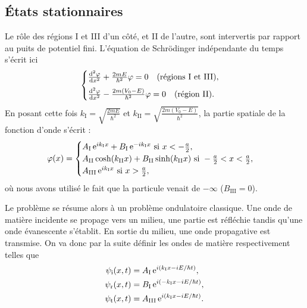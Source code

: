 \documentclass[12pt,fancy]{cours}
\begin{document}
\subsection{États stationnaires}


Le rôle des régions I et III d'un côté, et II de l'autre, sont intervertis par rapport au puits de potentiel fini. L'équation de Schrödinger indépendante du temps s’écrit ici
\begin{equation}
\begin{cases}
\frac{\mathrm{d}^2\varphi}{\mathrm{d} x^2}+\frac{2mE}{\hbar^2}\varphi=0\quad\text{(régions I et III)},\\[2mm]
\frac{\mathrm{d}^2\varphi}{\mathrm{d} x^2}-\frac{2m\left(V_0-E\right)}{\hbar^2}\varphi=0\quad\text{(région II)}.
\end{cases}
\label{eqn:schro_tunnel}
\end{equation}
En posant cette fois $k_\mathrm{I}=\sqrt{\frac{2mE}{\hbar^2}}$ et $k_\mathrm{II}=\sqrt{\frac{2m\left(V_0-E\right)}{\hbar^2}}$, la partie spatiale de la fonction d'onde s'écrit :
\begin{equation}
\varphi(x)=\begin{cases}
A_\mathrm{I}\,\mathrm{e}^{ik_\mathrm{I}x}+B_\mathrm{I}\,\mathrm{e}^{-ik_\mathrm{I}x} \text{ si } x<-\frac{a}{2}, \\
A_\mathrm{II}\cosh(k_\mathrm{II}x)+B_\mathrm{II}\sinh(k_\mathrm{II}x) \text{ si } -\frac{a}{2}<x<\frac{a}{2}, \\
A_\mathrm{III}\,\mathrm{e}^{ik_\mathrm{I}x} \text{ si } x>\frac{a}{2},
\end{cases}
\end{equation}
où nous avons utilisé le fait que la particule venait de $-\infty$ ($B_\mathrm{III}=0$).

Le problème se résume alors à un problème ondulatoire classique. Une onde de matière incidente se propage vers un milieu, une partie est réfléchie tandis qu'une onde évanescente s'établit. En sortie du milieu, une onde propagative est transmise. On va donc par la suite définir les ondes de matière  respectivement telles que
\begin{equation}
\begin{split}
\psi_\mathrm{i}(x,t)&=A_\mathrm{I}\,\mathrm{e}^{i(k_\mathrm{I}x-iE/\hbar t)},\\
\psi_\mathrm{r}(x,t)&=B_\mathrm{I}\,\mathrm{e}^{i(-k_\mathrm{I}x-iE/\hbar t)},\\
\psi_\mathrm{t}(x,t)&=A_\mathrm{III}\,\mathrm{e}^{i(k_\mathrm{I}x-iE/\hbar t)}.
\end{split}
\end{equation}
\end{document}
